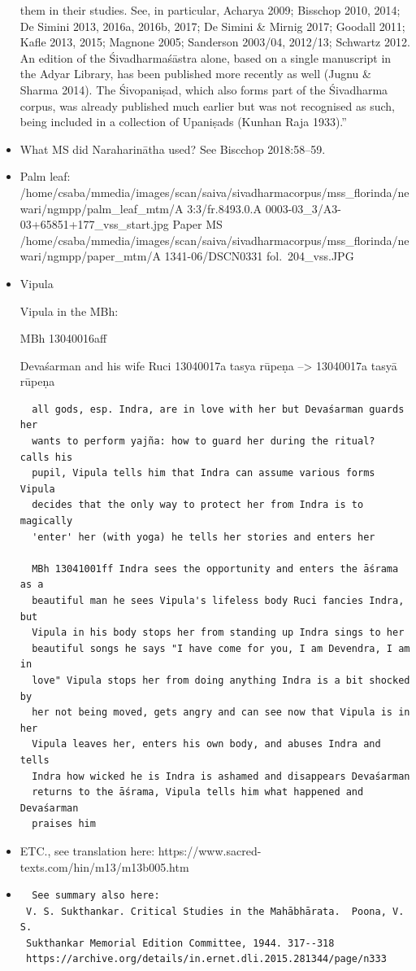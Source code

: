 \documentclass[12pt]{book}
\begin{document}
\begin{itemize}
  them in their studies. See, in particular, Acharya 2009; Bisschop
  2010, 2014; De Simini 2013, 2016a, 2016b, 2017; De Simini \& Mirnig
  2017; Goodall 2011; Kafle 2013, 2015; Magnone 2005; Sanderson 2003/04,
  2012/13; Schwartz 2012. An edition of the Śivadharmaśāstra alone,
  based on a single manuscript in the Adyar Library, has been published
  more recently as well (Jugnu \& Sharma 2014). The Śivopaniṣad, which
  also forms part of the Śivadharma corpus, was already published much
  earlier but was not recognised as such, being included in a collection
  of Upaniṣads (Kunhan Raja 1933).''
\item
  What MS did Naraharinātha used? See Biscchop 2018:58--59.
\item
  Palm leaf:
  /home/csaba/mmedia/images/scan/saiva/sivadharmacorpus/mss\_florinda/newari/ngmpp/palm\_leaf\_mtm/A
  3:3/fr.8493.0.A 0003-03\_3/A3-03+65851+177\_vss\_start.jpg Paper MS
  /home/csaba/mmedia/images/scan/saiva/sivadharmacorpus/mss\_florinda/newari/ngmpp/paper\_mtm/A
  1341-06/DSCN0331 fol.~204\_vss.JPG
\item
  Vipula

  Vipula in the MBh:

  MBh 13040016aff

  Devaśarman and his wife Ruci 13040017a tasya rūpeṇa --\textgreater{}
  13040017a tasyā rūpeṇa

\begin{verbatim}
  all gods, esp. Indra, are in love with her but Devaśarman guards her
  wants to perform yajña: how to guard her during the ritual?  calls his
  pupil, Vipula tells him that Indra can assume various forms Vipula
  decides that the only way to protect her from Indra is to magically
  'enter' her (with yoga) he tells her stories and enters her 

  MBh 13041001ff Indra sees the opportunity and enters the āśrama as a
  beautiful man he sees Vipula's lifeless body Ruci fancies Indra, but
  Vipula in his body stops her from standing up Indra sings to her
  beautiful songs he says "I have come for you, I am Devendra, I am in
  love" Vipula stops her from doing anything Indra is a bit shocked by
  her not being moved, gets angry and can see now that Vipula is in her
  Vipula leaves her, enters his own body, and abuses Indra and tells
  Indra how wicked he is Indra is ashamed and disappears Devaśarman
  returns to the āśrama, Vipula tells him what happened and Devaśarman
  praises him
\end{verbatim}
\item
  ETC., see translation here:
  https://www.sacred-texts.com/hin/m13/m13b005.htm
\item
\begin{verbatim}
  See summary also here:
 V. S. Sukthankar. Critical Studies in the Mahābhārata.  Poona, V. S.
 Sukthankar Memorial Edition Committee, 1944. 317--318
 https://archive.org/details/in.ernet.dli.2015.281344/page/n333
\end{verbatim}
\end{itemize}
\end{document}

